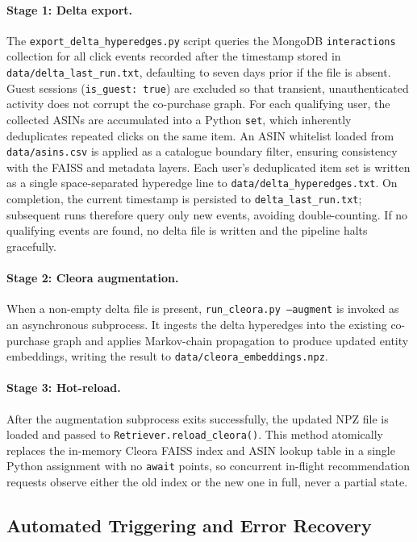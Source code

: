 \paragraph{Stage 1: Delta export.}
The \texttt{export\_delta\_hyperedges.py} script queries the MongoDB \texttt{interactions} collection for all click events recorded after the timestamp stored in \texttt{data/delta\_last\_run.txt}, defaulting to seven days prior if the file is absent.
Guest sessions (\texttt{is\_guest: true}) are excluded so that transient, unauthenticated activity does not corrupt the co-purchase graph.
For each qualifying user, the collected ASINs are accumulated into a Python \texttt{set}, which inherently deduplicates repeated clicks on the same item.
An ASIN whitelist loaded from \texttt{data/asins.csv} is applied as a catalogue boundary filter, ensuring consistency with the FAISS and metadata layers.
Each user's deduplicated item set is written as a single space-separated hyperedge line to \texttt{data/delta\_hyperedges.txt}.
On completion, the current timestamp is persisted to \texttt{delta\_last\_run.txt}; subsequent runs therefore query only new events, avoiding double-counting.
If no qualifying events are found, no delta file is written and the pipeline halts gracefully.

\paragraph{Stage 2: Cleora augmentation.}
When a non-empty delta file is present, \texttt{run\_cleora.py --augment} is invoked as an asynchronous subprocess.
It ingests the delta hyperedges into the existing co-purchase graph and applies Markov-chain propagation to produce updated entity embeddings, writing the result to \texttt{data/cleora\_embeddings.npz}.

\paragraph{Stage 3: Hot-reload.}
After the augmentation subprocess exits successfully, the updated NPZ file is loaded and passed to \texttt{Retriever.reload\_cleora()}.
This method atomically replaces the in-memory Cleora FAISS index and ASIN lookup table in a single Python assignment with no \texttt{await} points, so concurrent in-flight recommendation requests observe either the old index or the new one in full, never a partial state.

\subsection{Automated Triggering and Error Recovery}
\label{sec:cleora_trigger}

